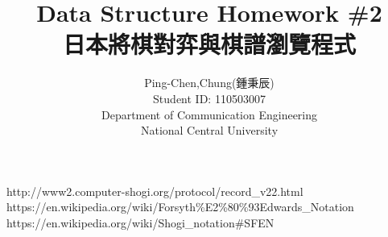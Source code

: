 
\usepackage[whole]{bxcjkjatype}
\usepackage{ohtex}



\title{Data Structure Homework \#2 \\日本將棋對弈與棋譜瀏覽程式}
\author{Ping-Chen,Chung(鍾秉辰)\\Student ID: 110503007\\Department of Communication Engineering\\National Central University}

	\maketitle
	\tableofcontents
	\newpage
	    
	
	\newpage
	
	\newpage
% 	



	
	
	
% 	




	\begin{thebibliography}{99}  
	
	 http://www2.computer-shogi.org/protocol/record\_v22.html
	 https://en.wikipedia.org/wiki/Forsyth\%E2\%80\%93Edwards\_Notation
	 https://en.wikipedia.org/wiki/Shogi\_notation#SFEN
	
	
	
		
	\end{thebibliography} 



